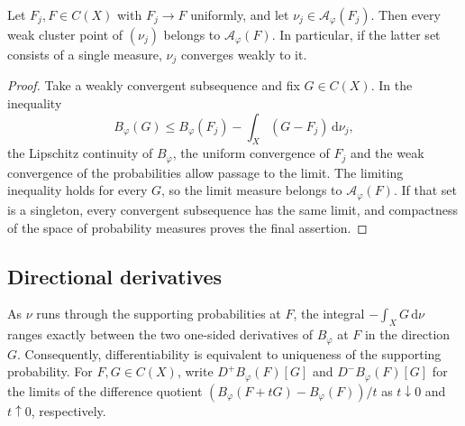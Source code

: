 \begin{proposition}
\label{prop:weak-adjoint-stability}
Let $F_j,F\in C(X)$ with $F_j\to F$ uniformly, and let $\nu_j\in\mathcal A_\varphi(F_j)$. Then every weak cluster point of $(\nu_j)$ belongs to $\mathcal A_\varphi(F)$. In particular, if the latter set consists of a single measure, $\nu_j$ converges weakly to it.
\end{proposition}
\begin{proof}
Take a weakly convergent subsequence and fix $G\in C(X)$. In the inequality
\[
 B_\varphi(G)\leq B_\varphi(F_j)-\int_X(G-F_j)\,\mathrm{d}\nu_j,
\]
the Lipschitz continuity of $B_\varphi$, the uniform convergence of $F_j$ and the weak convergence of the probabilities allow passage to the limit. The limiting inequality holds for every $G$, so the limit measure belongs to $\mathcal A_\varphi(F)$. If that set is a singleton, every convergent subsequence has the same limit, and compactness of the space of probability measures proves the final assertion.
\end{proof}

\subsection{Directional derivatives}

As $\nu$ runs through the supporting probabilities at $F$, the integral $-\int_XG\,\mathrm{d}\nu$ ranges exactly between the two one-sided derivatives of $B_\varphi$ at $F$ in the direction $G$. Consequently, differentiability is equivalent to uniqueness of the supporting probability. For $F,G\in C(X)$, write $D^+B_\varphi(F)[G]$ and $D^-B_\varphi(F)[G]$ for the limits of the difference quotient $(B_\varphi(F+tG)-B_\varphi(F))/t$ as $t\downarrow0$ and $t\uparrow0$, respectively.

